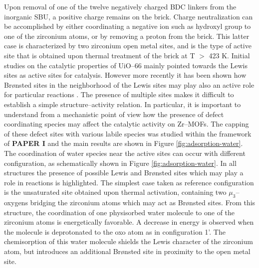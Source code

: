 Upon removal of one of the twelve negatively charged BDC linkers from the inorganic  SBU, a positive charge remains on the brick. Charge neutralization can be accomplished by either coordinating a negative ion such as hydroxyl group to one of the zirconium atoms, or by removing a proton from the brick. This latter case is characterized by two zirconium open metal sites, and is the type of active site that is obtained upon thermal treatment of the brick at T $>$ 423 K. Initial studies on the catalytic properties of UiO--66 mainly pointed towards the Lewis sites as active sites for catalysis. However more recently it has been shown how Br\o{}nsted sites in the neighborhood of the Lewis sites may play also an active role for particular reactions \cite{canivet2014water, oien2014detailed, canivet2016origin, ling2016dynamic, liu2016probing, klet2016evaluation, vandichel2016water, ghosh2014water}. The presence of multiple sites makes it difficult to establish a simple structure--activity relation. In particular, it is important to understand from a mechanistic point of view how the presence of defect coordinating species may affect the catalytic activity on Zr--MOFs. The capping of these defect sites with various labile species was studied within the framework of \textbf{PAPER I} and the main results are shown in Figure \ref{fig:adsorption-water}.
\npar
The coordination of water species near the active sites can occur with different configuration, as schematically shown in Figure \ref{fig:adsorption-water}. In all structures the presence of possible Lewis and Br\o{}nsted sites which may play a role in reactions is highlighted. The simplest case taken as reference configuration is the unsaturated site obtained upon thermal activation, containing two $\mu_3$--oxygens bridging the zirconium atoms which may act as Br\o{}nsted sites. From this structure, the coordination of one physisorbed water molecule to one of the zirconium atoms is energetically favorable. A decrease in energy is observed when the molecule is deprotonated to the oxo atom as in configuration 1’. The chemisorption of this water molecule shields the Lewis character of the zirconium atom, but introduces an additional Br\o{}nsted site in proximity to the open metal site. 
\npar
